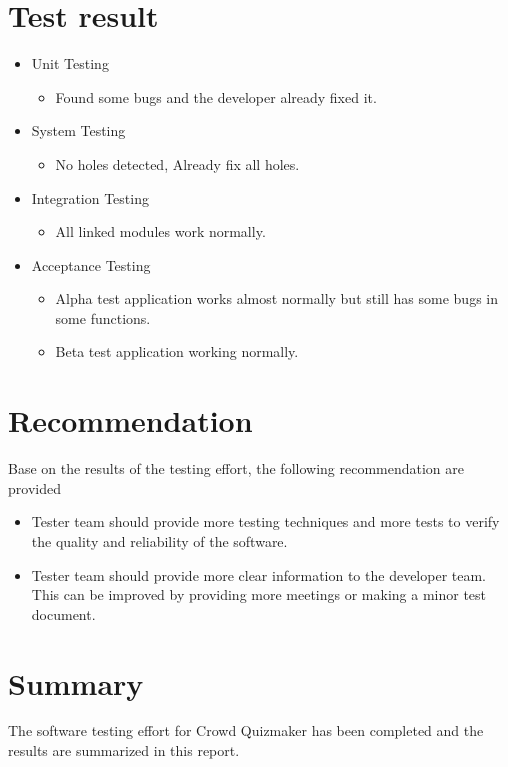 \documentclass[ 10pt]{report}
\begin{document}
    \section{Test result}
    \begin{itemize}
        \item Unit Testing \begin{itemize}
            \item Found some bugs and the developer already fixed it.
        \end{itemize}
        \item System Testing \begin{itemize}
            \item No holes detected, Already fix all holes.
        \end{itemize}
        \item Integration Testing \begin{itemize}
            \item All linked modules work normally.
        \end{itemize}
        \item Acceptance Testing \begin{itemize}
            \item Alpha test application works almost normally but still has some bugs in some functions.
            \item Beta test application working normally.
        \end{itemize}
    \end{itemize}
    \section{Recommendation}
    Base on the results of the testing effort, the following recommendation are provided
    \begin{itemize}
        \item Tester team should provide more testing techniques and more tests to verify the quality and reliability of the software.
        \item Tester team should provide more clear information to the developer team. This can be improved by providing more meetings or making a minor test document.
    \end{itemize}
    \section{Summary}
    The software testing effort for Crowd Quizmaker has been completed and the results are summarized in this report.
    
\end{document}
